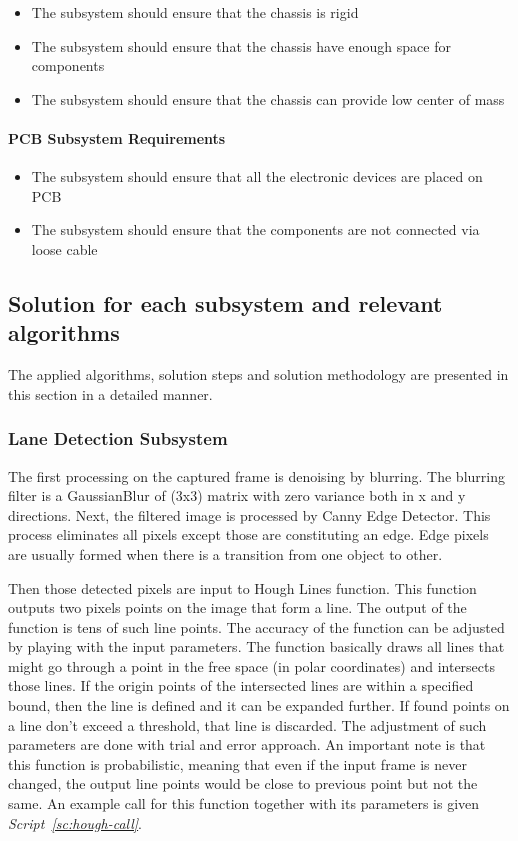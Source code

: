 \documentclass[a4paper,12pt]{article}
\begin{document}
			\begin{itemize}
			\item The subsystem should ensure that the chassis is rigid 
			\item The subsystem should ensure that the chassis have enough space for components
			\item The subsystem should ensure that the chassis can provide low center of mass 

		\end{itemize}
		
	\paragraph{PCB Subsystem Requirements}
	
		\begin{itemize}
			\item The subsystem should ensure that all the electronic devices are placed on PCB
			\item The subsystem should ensure that the components are not connected via loose cable 	
		\end{itemize}	



	



	\subsection{Solution for each subsystem and relevant algorithms}
		The applied algorithms, solution steps and solution methodology are presented in this section in a detailed manner.
			\subsubsection{Lane Detection Subsystem}
				The first processing on the captured frame is denoising by blurring. The blurring filter is a GaussianBlur of (3x3) matrix with zero variance both in x and y directions. Next, the filtered image is processed by Canny Edge Detector. This process eliminates all pixels except those are constituting an edge. Edge pixels are usually formed when there is a transition from one object to other. 
				
				Then those detected pixels are input to Hough Lines function. This function outputs two pixels points on the image that form a line. The output of the function is tens of such line points. The accuracy of the function can be adjusted by playing with the input parameters. The function basically draws all lines that might go through a point in the free space (in polar coordinates) and intersects those lines. If the origin points of the intersected lines are within a specified bound, then the line is defined and it can be expanded further. If found points on a line don't exceed a threshold, that line is discarded. The adjustment of such parameters are done with trial and error approach. An important note is that this function is probabilistic, meaning that even if the input frame is never changed, the output line points would be close to previous point but not the same. An example call for this function together with its parameters is given \textit{Script~\ref{sc:hough-call}}.
				
\end{document}
